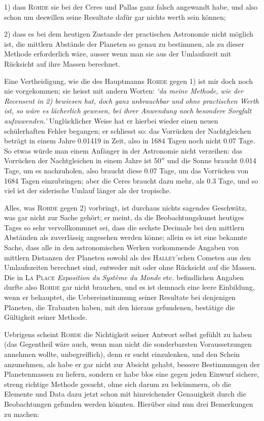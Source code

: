 1) dass \textsc{Rohde} sie bei der Ceres und Pallas ganz falsch angewandt habe, und also schon um deswillen seine Resultate dafür gar nichts werth sein können;

2) dass es bei dem heutigen Zustande der practischen Astronomie nicht möglich ist, die mittlern Abstände der Planeten so genau zu bestimmen, als zu dieser Methode erforderlich wäre, ausser wenn man sie aus der Umlaufszeit mit Rücksicht auf ihre Massen berechnet.

Eine Vertheidigung, wie die des Hauptmanns \textsc{Rohde} gegen 1) ist mir doch noch nie vorgekommen; sie heisst mit andern Worten: \emph{`da meine Methode, wie der Recensent in 2) bewiesen hat, doch ganz unbrauchbar und ohne practischen Werth ist, so wäre es lächerlich gewesen, bei ihrer Anwendung noch besondere Sorgfalt aufzuwenden.'} Unglücklicher Weise hat er hierbei wieder einen neuen schülerhaften Fehler begangen; er schliesst so: das Vorrücken der Nachtgleichen beträgt in einem Jahre 0.01419 in Zeit, also in 1684 Tagen noch nicht 0.07 Tage. So etwas würde man einem Anfänger in der Astronomie nicht verzeihen: das Vorrücken der Nachtgleichen in einem Jahre ist 50$''$ und die Sonne braucht 0.014 Tage, um es nachzuholen, also braucht diese 0.07 Tage, um das Vorrücken von 1684 Tagen einzubringen; aber die Ceres braucht dazu mehr, als 0.3 Tage, und so viel ist der siderische Umlauf länger als der tropische.

Alles, was \textsc{Rohde} gegen 2) vorbringt, ist durchaus nichts sagendes Geschwätz, was gar nicht zur Sache gehört; er meint, da die Beobachtungskunst heutiges Tages so sehr vervollkommnet sei, dass die sechste Decimale bei den mittlern Abständen als zuverlässig angesehen werden könne; allein es ist eine bekannte Sache, dass alle in den astronomischen Werken vorkommende Angaben von mittlern Distanzen der Planeten sowohl als des \textsc{Halley}'schen Cometen aus den Umlaufszeiten berechnet sind, entweder mit oder ohne Rücksicht auf die Massen. Die in \textsc{La Place} \emph{Exposition du Système du Monde} etc. befindlichen Angaben durfte also \textsc{Rohde} gar nicht brauchen, und es ist demnach eine leere Einbildung, wenn er behauptet, die Uebereinstimmung seiner Resultate bei denjenigen Planeten, die Trabanten haben, mit den hieraus gefundenen, bestätige die Gültigkeit seiner Methode.

Uebrigens scheint \textsc{Rohde} die Nichtigkeit seiner Antwort selbst gefühlt zu haben (das Gegentheil wäre auch, wenn man nicht die sonderbarsten Voraussetzungen annehmen wollte, unbegreiflich), denn er sucht einzulenken, und den Schein anzunehmen, als habe er gar nicht zur Absicht gehabt, bessere Bestimmungen der Planetenmassen zu liefern, sondern er habe blos eine gegen jeden Einwurf sichere, streng richtige Methode gesucht, ohne sich darum zu bekümmern, ob die Elemente und Data dazu jetzt schon mit hinreichender Genauigkeit durch die Beobachtungen gefunden werden könnten. Hierüber sind nun drei Bemerkungen zu machen:

